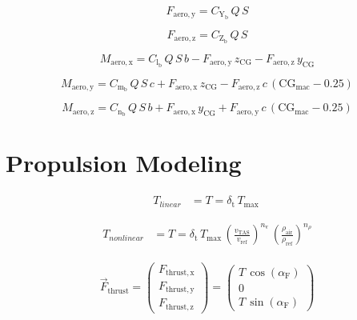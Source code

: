 \documentclass{article}
\begin{document}
\begin{dmath}
F_{\mathrm{aero,y}}=C_{\mathrm{Y}_{\mathrm{b}}}\,Q\,S
\end{dmath}

\begin{dmath}
F_{\mathrm{aero,z}}=C_{\mathrm{Z}_{\mathrm{b}}}\,Q\,S
\end{dmath}

\begin{dmath}
M_{\mathrm{aero,x}}=C_{\mathrm{l}_{\mathrm{b}}}\,Q\,S\,b-F_{\mathrm{aero,y}}\,z_{\mathrm{CG}}-F_{\mathrm{aero,z}}\,y_{\mathrm{CG}}
\end{dmath}

\begin{dmath}
M_{\mathrm{aero,y}}=C_{\mathrm{m}_{\mathrm{b}}}\,Q\,S\,c+F_{\mathrm{aero,x}}\,z_{\mathrm{CG}}-F_{\mathrm{aero,z}}\,c\,\left(\mathrm{CG}_{\mathrm{mac}}-0.25\right)
\end{dmath}

\begin{dmath}
M_{\mathrm{aero,z}}=C_{\mathrm{n}_{\mathrm{b}}}\,Q\,S\,b+F_{\mathrm{aero,x}}\,y_{\mathrm{CG}}+F_{\mathrm{aero,y}}\,c\,\left(\mathrm{CG}_{\mathrm{mac}}-0.25\right)
\end{dmath}

\section{Propulsion Modeling}

\begin{dmath}
\begin{aligned}
T_{linear}&=T=\delta_{\mathrm{t}}\,T_{\mathrm{max}}\
\end{aligned}
\end{dmath}

\begin{dmath}
\begin{aligned}
T_{nonlinear}&=T=\delta _{\mathrm{t}}\,T_{\mathrm{max}}\,{\left(\frac{v_{\mathrm{TAS}}}{v_{\mathrm{ref}}}\right)}^{n_{\mathrm{v}}}\,{\left(\frac{\rho _{\mathrm{air}}}{\rho _{\mathrm{ref}}}\right)}^{n_{\rho }}
\end{aligned}
\end{dmath}

\begin{dmath}
\begin{aligned}
\overrightarrow{F}_{\mathrm{thrust}}=\left(\begin{array}{c} F_{\mathrm{thrust,x}}\\ F_{\mathrm{thrust,y}}\\ F_{\mathrm{thrust,z}} \end{array}\right)=\left(\begin{array}{c} T\,\cos\left(\alpha _{\mathrm{F}}\right)\\ 0\\ T\,\sin\left(\alpha _{\mathrm{F}}\right) \end{array}\right)
\end{aligned}
\end{dmath}
\end{document}
